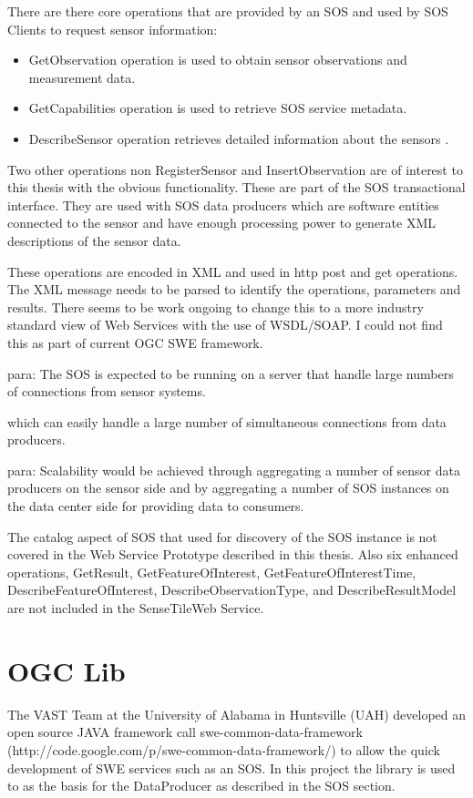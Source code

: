 \documentclass[]{final_report}
\begin{document}
There are there core operations that are provided by an SOS and used by SOS Clients to request sensor information:
 \begin{itemize}
\item GetObservation operation is used to obtain sensor observations and measurement data.
\item GetCapabilities operation is used to retrieve SOS service metadata.
\item DescribeSensor operation retrieves detailed information about the sensors .
\end{itemize}

Two other operations non RegisterSensor and InsertObservation are of interest to this thesis
with the obvious functionality. These are part of the SOS transactional interface. They are used with SOS data producers which are software entities connected to the sensor and have enough processing power to generate XML descriptions of the sensor data.



These operations are encoded in XML and used in http post and get operations. The XML message needs to be parsed to identify the operations, parameters and results. There seems to be work ongoing to change this to a more industry standard view of Web Services with the use of WSDL/SOAP. I could not find this as part of current OGC SWE framework.

para: The SOS is expected to be running on a  server that  handle large numbers of connections
from sensor systems.

which can easily handle a large number of simultaneous connections from data
producers.

para: Scalability would be achieved through aggregating a number of
sensor data producers on the sensor side and by aggregating a number of SOS instances
on the data center side for providing data to consumers. 

The catalog aspect of SOS that used for discovery of the SOS instance is not covered in the Web Service Prototype described in this thesis. Also six enhanced operations, GetResult,
GetFeatureOfInterest, GetFeatureOfInterestTime, DescribeFeatureOfInterest,
DescribeObservationType, and DescribeResultModel are not included in the SenseTileWeb Service.

\section{OGC Lib}
The VAST Team at the University of Alabama in Huntsville (UAH)  developed an open source JAVA framework call swe-common-data-framework (http://code.google.com/p/swe-common-data-framework/) to allow the quick development of SWE services such as an SOS. In this project the library is used to as the basis for the DataProducer as described in the SOS section.
\end{document}
